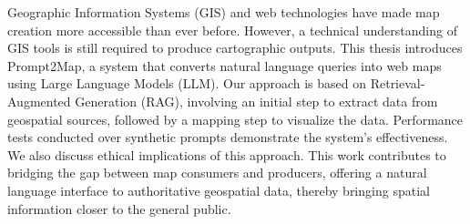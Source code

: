 
%

Geographic Information Systems (GIS) and web technologies have made map creation more accessible than ever before. However, a technical understanding of GIS tools is still required to produce cartographic outputs. 
This thesis introduces Prompt2Map, a system that converts natural language queries into web maps using Large Language Models (LLM). 
Our approach is based on Retrieval-Augmented Generation (RAG), involving an initial step to extract data from geospatial sources, followed by a mapping step to visualize the data. 
Performance tests conducted over synthetic prompts demonstrate the system's effectiveness. 
We also discuss ethical implications of this approach. 
This work contributes to bridging the gap between map consumers and producers, offering a natural language interface to authoritative geospatial data, thereby bringing spatial information closer to the general public.

